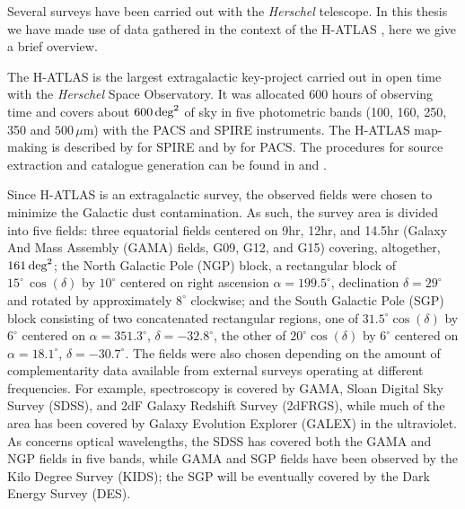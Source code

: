 Several surveys have been carried out with the \textit{Herschel} telescope. In this thesis we have made use of data gathered in the context of the H-ATLAS \citep{Eales2010a}, here we give a brief overview.

The H-ATLAS is the largest extragalactic key-project carried out in open time with the \textit{Herschel} Space Observatory. It was allocated 600 hours of observing time and covers about $600\,\hbox{deg}^2$ of sky in five photometric bands (100, 160, 250, 350 and $500\,\mu$m) with the PACS and SPIRE instruments. The H-ATLAS map-making is described by \citet{Pascale2011} for SPIRE and by \citet{Ibar2010} for PACS. The procedures for source extraction and catalogue generation can be found in \citet{Rigby2011} and \citet{Valiante2016}. 

Since H-ATLAS is an extragalactic survey, the observed fields were chosen to minimize the Galactic dust contamination. As such, the survey area is divided into five fields: three equatorial fields centered on 9hr, 12hr, and 14.5hr (Galaxy And Mass Assembly (GAMA) fields, G09, G12, and G15) covering, altogether, $161\,\hbox{deg}^2$; the North Galactic Pole (NGP) block, a rectangular block of $15^\circ\,\cos(\delta)$ by $10^\circ$ centered on right ascension $\alpha=199.5^\circ$, declination $\delta=29^\circ$ and rotated by approximately $8^\circ$ clockwise; and the South Galactic Pole (SGP) block consisting of two concatenated rectangular regions, one of $31.5^\circ\cos(\delta)$ by $6^\circ$ centered on $\alpha=351.3^\circ$, $\delta=-32.8^\circ$, the other of $20^\circ\cos(\delta)$ by $6^\circ$ centered on $\alpha=18.1^\circ$, $\delta=-30.7^\circ$. The fields were also chosen depending on the amount of complementarity data available from external surveys operating at different frequencies. For example, spectroscopy is covered by GAMA, Sloan Digital Sky Survey (SDSS), and 2dF Galaxy Redshift Survey (2dFRGS), while much of the area has been covered by Galaxy Evolution Explorer (GALEX) in the ultraviolet.  As concerns optical wavelengths, the SDSS has covered both the GAMA and NGP fields in five bands, while GAMA and SGP fields have been observed by the Kilo Degree Survey (KIDS); the SGP will be eventually covered by the Dark Energy Survey (DES).


